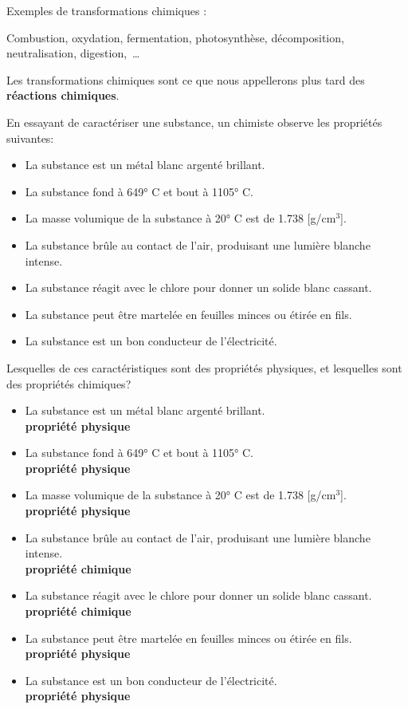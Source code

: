 \documentclass[
  11pt,
  a4paper,
  openany]{book}
\providecommand{\tightlist}{%
  \setlength{\itemsep}{0pt}\setlength{\parskip}{0pt}}
\begin{document}
Exemples de transformations chimiques :

Combustion, oxydation, fermentation, photosynthèse, décomposition, neutralisation, digestion,~\ldots{}

Les transformations chimiques sont ce que nous appellerons plus tard des \textbf{réactions chimiques}.

\begin{Exercise}
En essayant de caractériser une substance, un chimiste observe les propriétés suivantes:

\begin{itemize}
\tightlist
\item
  La substance est un métal blanc argenté brillant.
\item
  La substance fond à 649° C et bout à 1105° C.
\item
  La masse volumique de la substance à 20° C est de 1.738 {[}g/cm\(^3\){]}.
\item
  La substance brûle au contact de l'air, produisant une lumière blanche intense.
\item
  La substance réagit avec le chlore pour donner un solide blanc cassant.
\item
  La substance peut être martelée en feuilles minces ou étirée en fils.
\item
  La substance est un bon conducteur de l'électricité.
\end{itemize}

Lesquelles de ces caractéristiques sont des propriétés physiques, et lesquelles sont des propriétés chimiques?

\end{Exercise}

\begin{Answer}

\begin{itemize}
\tightlist
\item
  La substance est un métal blanc argenté brillant.\\
  \textbf{propriété physique}
\item
  La substance fond à 649° C et bout à 1105° C.\\
  \textbf{propriété physique}
\item
  La masse volumique de la substance à 20° C est de 1.738 {[}g/cm\(^3\){]}.\\
  \textbf{propriété physique}
\item
  La substance brûle au contact de l'air, produisant une lumière blanche intense.\\
  \textbf{propriété chimique}
\item
  La substance réagit avec le chlore pour donner un solide blanc cassant.\\
  \textbf{propriété chimique}
\item
  La substance peut être martelée en feuilles minces ou étirée en fils.\\
  \textbf{propriété physique}
\item
  La substance est un bon conducteur de l'électricité.\\
  \textbf{propriété physique}
\end{itemize}

\end{Answer}
\end{document}
